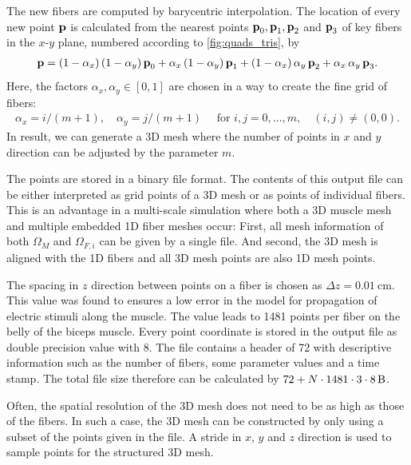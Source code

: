 The new fibers are computed by barycentric interpolation. The location of every new point $\textbf{p}$ is calculated from the nearest points $\textbf{p}_0, \textbf{p}_1, \textbf{p}_2$ and $\textbf{p}_3$ of key fibers in the $x$-$y$ plane, numbered according to  \cref{fig:quads_tris}, by%
\begin{align*}
  \textbf{p} = (1-\alpha_x)\,(1-\alpha_y)\,\textbf{p}_0 + \alpha_x\,(1-\alpha_y)\,\textbf{p}_1 
        + (1-\alpha_x)\,\alpha_y\,\textbf{p}_2 + \alpha_x\,\alpha_y\,\textbf{p}_3.
\end{align*}
Here, the factors $\alpha_x,\alpha_y \in [0,1]$ are chosen in a way to create the fine grid of fibers:
%
\begin{align*}
  \alpha_x = i / (m+1), \quad \alpha_y = j / (m+1)\quad \text{ for }i,j = 0, \dots,m, \quad (i,j) \neq (0,0).
\end{align*}
In result, we can generate a 3D mesh where the number of points in $x$ and $y$ direction can be adjusted by the parameter $m$.

The points are stored in a binary file format. The contents of this output file can be either interpreted as grid points of a 3D mesh or as points of individual fibers. This is an advantage in a multi-scale simulation where both a 3D muscle mesh and multiple embedded 1D fiber meshes occur: First, all mesh information of both $\Omega_M$ and $\Omega_{F,i}$ can be given by a single file. And second, the 3D mesh is aligned with the 1D fibers and all 3D mesh points are also 1D mesh points. 

The spacing in $z$ direction between points on a fiber is chosen as $\Delta z = \SI{0.01}{\cm}$. This value was found to ensures a low error in the model for propagation of electric stimuli along the muscle. The value leads to 1481 points per fiber on the belly of the biceps muscle. Every point coordinate is stored in the output file as double precision value with \SI{8}{\byte}. The file contains a header of \SI{72}{\byte} with descriptive information such as the number of fibers, some parameter values and a time stamp. The total file size therefore can be calculated by $72+N\cdot 1481\cdot 3\cdot \SI{8}{\byte}$.

Often, the spatial resolution of the 3D mesh does not need to be as high as those of the fibers. In such a case, the 3D mesh can be constructed by only using a subset of the points given in the file. A stride in $x$, $y$ and $z$ direction is used to sample points for the structured 3D mesh.


